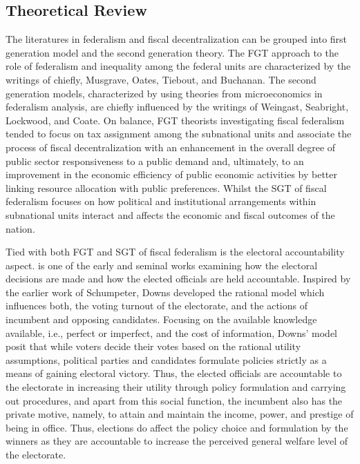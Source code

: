 \subsection{Theoretical Review} \vspace{-3mm}
The literatures in federalism and fiscal decentralization can be grouped into first generation model and the second generation theory. The FGT approach to the role of federalism and inequality among the federal units are characterized by the writings of chiefly, Musgrave, Oates, Tiebout, and Buchanan. The second generation models, characterized by using theories from microeconomics in federalism analysis, are chiefly influenced by the writings of Weingast, Seabright, Lockwood, and  Coate. On balance, FGT theorists investigating fiscal federalism tended to focus on tax assignment among the subnational units and associate the process of fiscal decentralization with an enhancement in the overall degree of public sector responsiveness to a public demand and, ultimately, to an improvement in the economic efficiency of public economic activities by better linking resource allocation with public preferences. Whilst the SGT of fiscal federalism focuses on how political and institutional arrangements within subnational units interact and affects the economic and fiscal outcomes of the nation. \par
Tied with both FGT and SGT of fiscal federalism is the electoral accountability aspect.  is one of the early and  seminal works examining how the electoral decisions are made and how the elected officials are held accountable. Inspired by the earlier work of Schumpeter, Downs developed the rational model which influences both, the voting turnout of the electorate, and the actions of incumbent and opposing candidates. Focusing on the available knowledge available, i.e., perfect or imperfect, and the cost of information, Downs' model posit that while voters decide their votes based on the rational utility assumptions, political parties and candidates formulate policies strictly as a means of gaining electoral victory. Thus, the elected officials are accountable to the electorate in increasing their utility through policy formulation and carrying out procedures, and apart from this social function, the incumbent also has the private motive, namely, to attain and maintain the income, power, and prestige of being in office. Thus, elections do affect the policy choice and  formulation by the winners as they are accountable to increase the perceived general welfare level of the electorate. \par
